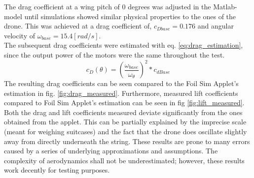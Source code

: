 The drag coefficient at a wing pitch of 0 degrees was adjusted in the Matlab-model until simulations showed similar physical properties to the ones of the drone. This was achieved at a drag coefficient of, $c_{Dbase} = 0.176$ and angular velocity of $\omega_{base} = 15.4 [rad/s]$.\\ 
The subsequent drag coefficients were estimated with eq. \ref{eq:drag_estimation}, since the output power of the motors were the same throughout the test.
\begin{equation}
\label{eq:drag_estimation}
    c_D(\theta) = \left(\frac{\omega_{base}}{\omega_{\theta}}\right)^2* c_{dBase}
\end{equation}
The resulting drag coefficients can be seen compared to the Foil Sim Applet's estimation in fig. \ref{fig:drag_measured}. Furthermore, measured lift coefficients compared to Foil Sim Applet's estimation can be seen in fig \ref{fig:lift_measured}.\\
Both the drag and lift coefficients measured deviate significantly from the ones obtained from the applet. This can be partially explained by the imprecise scale (meant for weighing suitcases) and the fact that the drone does oscillate slightly away from directly underneath the string. These results are prone to many errors caused by a series of underlying approximations and assumptions. The complexity of aerodynamics shall not be underestimated; however, these results work decently for testing purposes.

